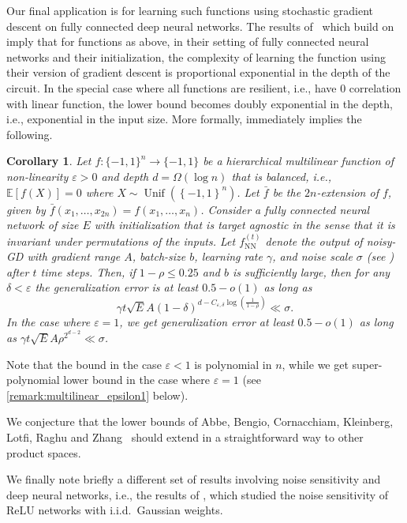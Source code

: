 \documentclass[12pt,letterpaper]{amsart}
\def\E{\mathbb{E}}
\def\eps{\varepsilon}
\def\Unif{\operatorname{Unif}}
\newcommand{\set}[1]{\left\{#1\right\}}
\newcommand{\1}[1]{1_{\left\{#1\right\}}}
\newtheorem{corollary}[theorem]{Corollary}
\theoremstyle{definition}
\theoremstyle{remark}
\begin{document}
Our final application is for learning such functions using stochastic gradient descent on fully connected deep neural networks. 
The results of~\cite{ABCKLRZ:22} which build on~\cite{AbbeSandon:20} imply that for functions as above, in their setting of fully connected neural networks and their initialization, the complexity of learning the function using their version of gradient descent is proportional exponential in the depth of the circuit.
In the special case where all functions are resilient, i.e., have $0$ correlation with linear function, the lower bound becomes doubly exponential in the depth, i.e., exponential in the input size.
More formally, \cite[Theorem 1]{ABCKLRZ:22} immediately implies the following.
\begin{corollary}
Let $f : \{-1,1\}^n \to \{-1,1\}$ be a hierarchical multilinear function of non-linearity $\eps>0$ and depth $d = \Omega(\log n)$ that is balanced, i.e., $\E[f(X)]=0$ where $X\sim\Unif(\set{-1,1}^n)$.
Let $\bar{f}$ be the $2n$-extension of $f$, given by 
$\bar{f}(x_1,\ldots,x_{2n}) = f(x_1,\ldots,x_n)$.
Consider a fully connected neural network of size $E$ with initialization that is target
agnostic in the sense that it is invariant under permutations of the inputs. 
Let $f^{(t)}_{\mathrm{NN}}$ denote the output of noisy-GD with gradient range $A$, batch-size $b$, learning rate $\gamma$, and noise scale $\sigma$ (see \cite[Definition 8]{ABCKLRZ:22}) after $t$ time steps. Then, if $1 - \rho \leq 0.25$  and $b$ is sufficiently large, then for any $\delta < \eps$ the generalization error is at least 
$
0.5 - o(1)$ as long as 
\[
\gamma t \sqrt{E} A (1-\delta)^{d-C_{\eps,\delta} \log(\frac{1}{1-\rho})}  \ll \sigma. 
\] 
In the case where $\eps = 1$, we get generalization error at least $0.5 - o(1)$ as long as 
$\gamma t \sqrt{E} A \rho^{2^{d-2}} \ll \sigma$.
\end{corollary}
Note that the bound in the case $\eps < 1$ is polynomial in $n$, while we get super-polynomial lower bound in the case where $\eps = 1$ (see  \cref{remark:multilinear_epsilon1} below).

We conjecture that the lower bounds of Abbe, Bengio, Cornacchiam, Kleinberg, Lotfi, Raghu and Zhang~\cite{ABCKLRZ:22} should extend in a straightforward way to other product spaces.

We finally note briefly a different set of results involving noise sensitivity and deep neural networks, i.e., the results of \cite{jonasson2023noise}, which studied the noise sensitivity of ReLU networks with i.i.d.\ Gaussian weights.
\end{document}
